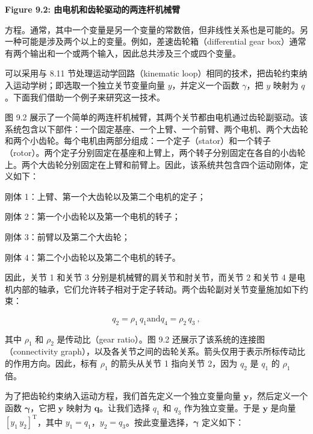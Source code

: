 \documentclass[10pt,a4paper]{book}
\theoremstyle{thmstyle} %
\theoremstyle{defstyle} %
\theoremstyle{prostyle} %
\begin{document}
\noindent\textbf{Figure 9.2: 由电机和齿轮驱动的两连杆机械臂}





方程。通常，其中一个变量是另一个变量的常数倍，但非线性关系也是可能的。另一种可能是涉及两个以上的变量。例如，差速齿轮箱（differential gear box）通常有两个输出和一个或两个输入，因此总共涉及三个或四个变量。



可以采用与 8.11 节处理运动学回路（kinematic loop）相同的技术，把齿轮约束纳入运动学树；即选取一个独立关节变量向量 $y$，并定义一个函数 $\gamma$，把 $y$ 映射为 $q$。下面我们借助一个例子来研究这一技术。



图 9.2 展示了一个简单的两连杆机械臂，其两个关节都由电机通过齿轮副驱动。该系统包含以下部件：一个固定基座、一个上臂、一个前臂、两个电机、两个大齿轮和两个小齿轮。每个电机由两部分组成：一个定子（stator）和一个转子（rotor）。两个定子分别固定在基座和上臂上，两个转子分别固定在各自的小齿轮上。两个大齿轮分别固定在上臂和前臂上。因此，该系统共包含四个运动刚体，定义如下：



刚体 1：上臂、第一个大齿轮以及第二个电机的定子；



刚体 2：第一个小齿轮以及第一个电机的转子；



刚体 3：前臂以及第二个大齿轮；



刚体 4：第二个小齿轮以及第二个电机的转子。



因此，关节 1 和关节 3 分别是机械臂的肩关节和肘关节，而关节 2 和关节 4 是电机内部的轴承，它们允许转子相对于定子转动。两个齿轮副对关节变量施加如下约束：



$$
q _ { 2 } = \rho _ { 1 } \, q _ { 1 }  \mathrm { a n d }  q _ { 4 } = \rho _ { 2 } \, q _ { 3 } \ ,
$$



其中 $\rho_{1}$ 和 $\rho_{2}$ 是传动比（gear ratio）。图 9.2 还展示了该系统的连接图（connectivity graph），以及各关节之间的齿轮关系。箭头仅用于表示所标传动比的作用方向。因此，标有 $\rho_{1}$ 的箭头从关节 1 指向关节 2，因为 $q_{2}$ 是 $q_{1}$ 的 $\rho_{1}$ 倍。



为了把齿轮约束纳入运动方程，我们首先定义一个独立变量向量 $\boldsymbol{y}$，然后定义一个函数 $\boldsymbol{\gamma}$，它把 $\boldsymbol{y}$ 映射为 $\boldsymbol{q}$。让我们选择 $q_{1}$ 和 $q_{3}$ 作为独立变量。于是 $\boldsymbol{y}$ 是向量 $[y_{1} \, y_{2}]^{\mathrm{T}}$，其中 $y_{1} = q_{1}$，$y_{2} = q_{3}$。按此变量选择，$\boldsymbol{\gamma}$ 定义如下：
\end{document}
